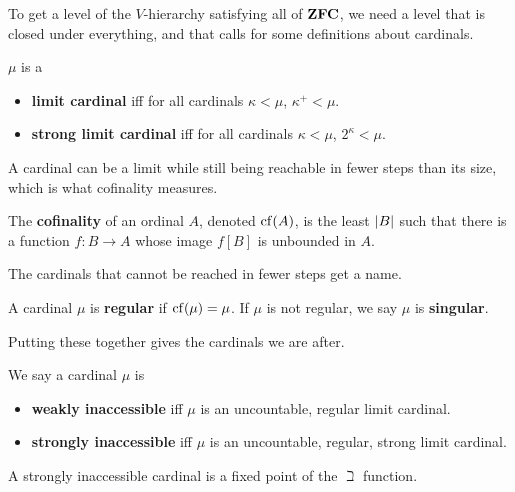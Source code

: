 To get a level of the $V$-hierarchy satisfying all of $\mathbf{ZFC}$, we need a level that is closed under everything, and that calls for some definitions about cardinals.

\begin{boxdefinition}
    $\mu$ is a
    \begin{itemize}
        \item \textbf{limit cardinal} iff for all cardinals $\kappa < \mu$, $\kappa^+ < \mu$.
        \item \textbf{strong limit cardinal} iff for all cardinals $\kappa < \mu$, $2^{\kappa} < \mu$.
    \end{itemize}
\end{boxdefinition}

A cardinal can be a limit while still being reachable in fewer steps than its size, which is what cofinality measures.

\begin{boxdefinition}[Cofinality]
    The \textbf{cofinality} of an ordinal $A$, denoted $\operatorname{cf}(A)$, is the least $\left\lvert B \right\rvert$ such that there is a function $f : B \to A$ whose image $f[B]$ is unbounded in $A$.
\end{boxdefinition}

The cardinals that cannot be reached in fewer steps get a name.

\begin{boxdefinition}
    A cardinal $\mu$ is \textbf{regular} if $\operatorname{cf}(\mu) = \mu$. If $\mu$ is not regular, we say $\mu$ is \textbf{singular}.
\end{boxdefinition}

Putting these together gives the cardinals we are after.

\begin{boxdefinition}
    We say a cardinal $\mu$ is
    \begin{itemize}
        \item \textbf{weakly inaccessible} iff $\mu$ is an uncountable, regular limit cardinal.
        \item \textbf{strongly inaccessible} iff $\mu$ is an uncountable, regular, strong limit cardinal.
    \end{itemize}
\end{boxdefinition}

A strongly inaccessible cardinal is a fixed point of the $\beth$ function.

